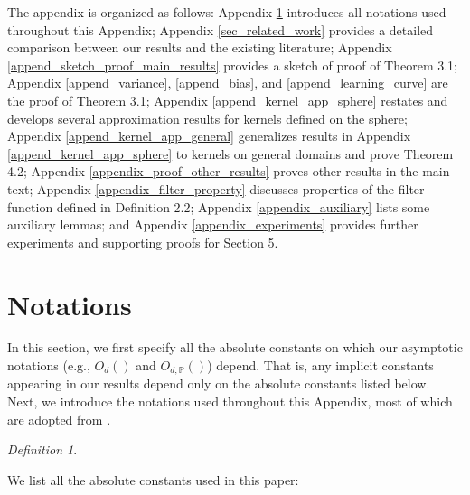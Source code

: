 \documentclass{article}
\theoremstyle{plain}
\theoremstyle{definition}
\theoremstyle{remark}
\newtheorem{definition}[theorem]{Definition}
\begin{document}
\clearpage

\appendix



\begin{appendix}

The appendix is organized as follows: 
Appendix \ref{append_notation} introduces all notations used throughout this Appendix; 
Appendix \ref{sec_related_work} provides a detailed comparison between our results and the existing literature;
Appendix \ref{append_sketch_proof_main_results} provides a sketch of proof of Theorem 3.1;
Appendix \ref{append_variance}, \ref{append_bias}, and \ref{append_learning_curve} are the proof of Theorem 3.1;
Appendix \ref{append_kernel_app_sphere} restates and develops several approximation results for kernels defined on the sphere;
Appendix \ref{append_kernel_app_general} generalizes results in Appendix \ref{append_kernel_app_sphere} to kernels on general domains and prove Theorem 4.2;
Appendix \ref{appendix_proof_other_results} proves other results in the main text;
Appendix \ref{appendix_filter_property} discusses properties of the filter function defined in Definition 2.2; 
Appendix \ref{appendix_auxiliary} lists some auxiliary lemmas;
and Appendix \ref{appendix_experiments} provides further experiments and supporting proofs for Section 5.










\section{Notations}\label{append_notation}


In this section, we first specify all the absolute constants on which our asymptotic notations (e.g., $O_{d}()$ and $O_{d, \mathbb{P}}()$) depend. 
That is, any implicit constants appearing in our results depend only on the absolute constants listed below. 
Next, we introduce the notations used throughout this Appendix, most of which are adopted from \cite{ghorbani2021linearized, zhang2024phase}.




\begin{definition}\label{def:abs_constants}

    We list all the absolute constants used in this paper:
    
    \begin{itemize}


\end{itemize}
\end{definition}
\end{appendix}
\end{document}
